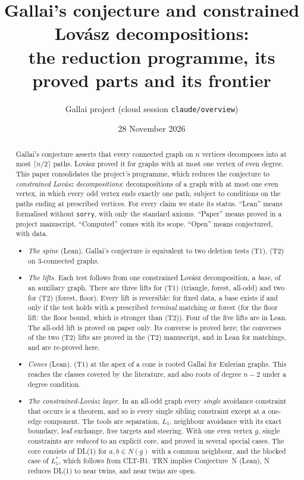\documentclass[11pt]{amsart}
\title[Gallai's conjecture and constrained Lov\'asz decompositions]{Gallai's conjecture and
constrained Lov\'asz decompositions:\\ the reduction programme, its proved parts and its frontier}
\author{Gallai project (cloud session \texttt{claude/overview})}
\date{28 November 2026}
\theoremstyle{definition}
\begin{document}
\begin{abstract}
Gallai's conjecture asserts that every connected graph on $n$ vertices decomposes into at most
$\lceil n/2\rceil$ paths. Lov\'asz proved it for graphs with at most one vertex of even degree. This paper consolidates the project's programme, which reduces the conjecture to
\emph{constrained Lov\'asz decompositions}: decompositions of a graph with at most one even vertex,
in which every odd vertex ends exactly one path, subject to conditions on the paths ending at
prescribed vertices. For every claim we state its status. ``Lean'' means formalised without
\texttt{sorry}, with only the standard axioms. ``Paper'' means proved in a project manuscript.
``Computed'' comes with its scope. ``Open'' means conjectured, with data.
\begin{itemize}[leftmargin=*]
\item \emph{The spine} (Lean). Gallai's conjecture is equivalent to two deletion tests (T1), (T2)
on $3$-connected graphs.
\item \emph{The lifts.} Each test follows from one constrained Lov\'asz decomposition, a
\emph{base}, of an auxiliary graph. There are three lifts for (T1) (triangle, forest, all-odd) and two
for (T2) (forest, floor). Every lift is reversible: for fixed data, a base exists if and only if the
test holds with a prescribed \emph{terminal} matching or forest (for the floor lift: the floor bound,
which is stronger than (T2)). Four of the five lifts are in Lean.
The all-odd lift is proved on paper only. Its converse is proved here; the converses of the two (T2)
lifts are proved in the (T2) manuscript, and in Lean for matchings, and are re-proved here.
\item \emph{Cones} (Lean). (T1) at the apex of a cone is rooted Gallai for Eulerian graphs. This
reaches the classes covered by the literature, and also roots of degree $n-2$ under a
degree condition.
\item \emph{The constrained-Lov\'asz layer.} In an all-odd graph every \emph{single} avoidance
constraint that occurs is a theorem, and so is every single sibling constraint except at a one-edge
component. The tools are separation, $L_1$, neighbour avoidance with its exact
boundary, leaf exchange, free targets and steering. With one even vertex $g$, single constraints are
\emph{reduced} to an explicit core, and proved in several special cases. The core consists of DL(1)
for $a,b\in N(g)$ with a common neighbour, and the blocked case of $L_1^*$, which follows from CLT-B1.
TRN implies Conjecture~N (Lean), N reduces DL(1) to near twins, and near twins are open.

\end{itemize}
\end{abstract}
\end{document}
